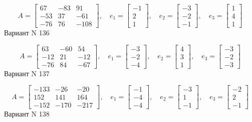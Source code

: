 \documentclass[11pt]{report}
\begin{document}
$$A = \left[\begin{matrix}67 & -83 & 91\\-53 & 37 & -61\\-76 & 76 & -108\end{matrix}\right],\quad e_1 = \left[\begin{matrix}-1\\2\\1\end{matrix}\right],\quad e_2 = \left[\begin{matrix}-3\\-2\\-1\end{matrix}\right],\quad e_3 = \left[\begin{matrix}1\\4\\1\end{matrix}\right]$$Вариант N 136

$$A = \left[\begin{matrix}63 & -60 & 54\\-12 & 21 & -12\\-76 & 84 & -67\end{matrix}\right],\quad e_1 = \left[\begin{matrix}-3\\-2\\-4\end{matrix}\right],\quad e_2 = \left[\begin{matrix}4\\3\\1\end{matrix}\right],\quad e_3 = \left[\begin{matrix}-3\\-2\\-3\end{matrix}\right]$$Вариант N 137

$$A = \left[\begin{matrix}-133 & -26 & -20\\152 & 141 & 164\\-152 & -170 & -217\end{matrix}\right],\quad e_1 = \left[\begin{matrix}-1\\-4\\-4\end{matrix}\right],\quad e_2 = \left[\begin{matrix}-3\\1\\-1\end{matrix}\right],\quad e_3 = \left[\begin{matrix}-2\\2\\-1\end{matrix}\right]$$Вариант N 138
\end{document}
